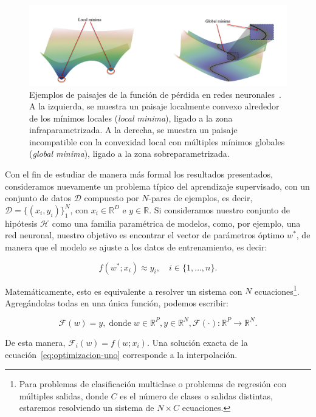 \begin{figure}[h]
    \centering
    \includegraphics[width=0.8\linewidth]{img/localglobalminima.png}
    \caption[Ejemplos de paisajes de la función de pérdida en redes neuronales~\cite{Liu2021}.]{Ejemplos de paisajes de la función de pérdida en redes neuronales~\cite{Liu2021}. A la izquierda, se muestra un paisaje localmente convexo alrededor de los mínimos locales (\textit{local minima}), ligado a la zona infraparametrizada. A la derecha, se muestra un paisaje incompatible con la convexidad local con múltiples mínimos globales (\textit{global minima}), ligado a la zona sobreparametrizada.}\label{fig:localglobalminima}
\end{figure}

Con el fin de estudiar de manera más formal los resultados presentados, consideramos nuevamente un problema típico del aprendizaje supervisado, con un conjunto de datos $\mathcal{D}$ compuesto por $N$-pares de ejemplos, es decir,  $\mathcal{D} = \{(x_i, y_i)\}_{1}^{N}$, con $x_i \in \mathbb{R}^{D}$ e $y \in \mathbb{R}$. Si consideramos nuestro conjunto de hipótesis $\mathcal{H}$ como una familia paramétrica de modelos, como, por ejemplo, una red neuronal, nuestro objetivo es encontrar el vector de parámetros óptimo $w^{*}$, de manera que el modelo se ajuste a los datos de entrenamiento, es decir:

\[
    f(w^{*}; x_i) \approx y_i, \quad i \in \{1,\ldots,n \}.
\]

Matemáticamente, esto es equivalente a resolver un sistema con $N$ ecuaciones\footnote{Para problemas de clasificación multiclase o problemas de regresión con múltiples salidas, donde $C$ es el número de clases o salidas distintas, estaremos resolviendo un sistema de $N \times C$ ecuaciones.}. Agregándolas todas en una única función, podemos escribir:

\begin{equation}\label{eq:optimizacion-uno}
    \mathcal{F}(w) = y, \; \text{donde} \; w \in \mathbb{R}^{P}, y \in \mathbb{R}^{N}, \mathcal{F}(\cdot):\mathbb{R}^{P} \to \mathbb{R}^{N}.
\end{equation}

De esta manera, $\mathcal{F}_{i}(w) = f(w; x_i)$. Una solución exacta de la ecuación~\eqref{eq:optimizacion-uno} corresponde a la interpolación.

